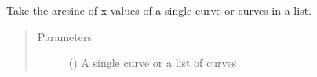 \documentclass[letterpaper,10pt,english]{sphinxmanual}
\begin{document}
\begin{fulllineitems}
\label{\detokenize{pydv:pydvpy.asinx}}
Take the arcsine of x values of a single curve or curves in a list.

\begin{sphinxVerbatim}[commandchars=\\\{\}]
  
\end{sphinxVerbatim}

\begin{sphinxVerbatim}[commandchars=\\\{\}]
\end{sphinxVerbatim}
\begin{quote}\begin{description}
\item[{Parameters}] \leavevmode
{} () \textendash{} A single curve or a list of curves

\end{description}\end{quote}

\end{fulllineitems}

\end{document}
